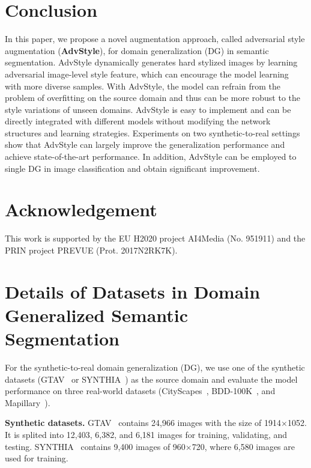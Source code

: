 \documentclass{article}
\newcommand{\ours}{AdvStyle\xspace}
\begin{document}
\section{Conclusion}
\label{sec:conclusion}
In this paper, we propose a novel augmentation approach, called adversarial style augmentation (\textbf{\ours}), for domain generalization (DG) in semantic segmentation. \ours dynamically generates hard stylized images by learning adversarial image-level style feature, which can encourage the model learning with more diverse samples. With \ours, the model can refrain from the problem of overfitting on the source domain and thus can be more robust to the style variations of unseen domains. \ours is easy to implement and can be directly integrated with different models without modifying the network structures and learning strategies. Experiments on two synthetic-to-real settings show that \ours can largely improve the generalization performance and achieve state-of-the-art performance. In addition, \ours can be employed to single DG in image classification and obtain significant improvement. 

\section*{Acknowledgement}
This work is supported by the EU H2020 project AI4Media (No. 951911) and the PRIN project PREVUE  (Prot. 2017N2RK7K).



\newpage

\small



\appendix


\section{Details of Datasets in Domain Generalized Semantic Segmentation}
\label{sec:dataset-seg}
For the synthetic-to-real domain generalization (DG), we use one of the synthetic datasets (GTAV~\cite{gtav} or SYNTHIA~\cite{synthia}) as the source domain and evaluate the model performance on three real-world datasets (CityScapes~\cite{CityScapes}, BDD-100K~\cite{bdd}, and Mapillary~\cite{mapillary}). 

\textbf{Synthetic datasets.} 
GTAV~\cite{gtav} contains 24,966 images with the size of 1914$\times$1052. It is splited into 12,403, 6,382, and 6,181 images for training, validating, and testing. SYNTHIA~\cite{synthia} contains 9,400 images of 960$\times$720, where 6,580 images are used for training.
\end{document}
